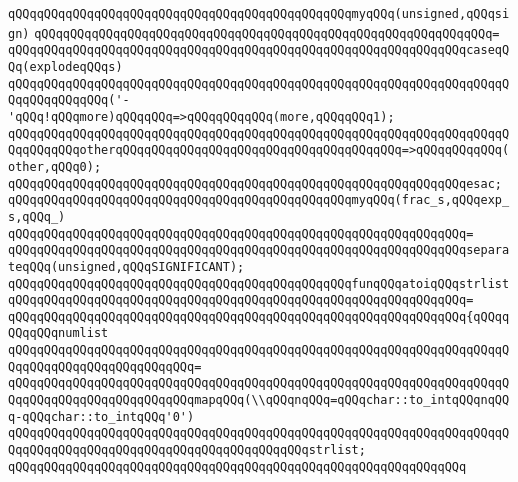 \verb|qQQqqQQqqQQqqQQqqQQqqQQqqQQqqQQqqQQqqQQqqQQqqQQqmyqQQq(unsigned,qQQqsign)|\newline
\verb|qQQqqQQqqQQqqQQqqQQqqQQqqQQqqQQqqQQqqQQqqQQqqQQqqQQqqQQqqQQqqQQq=|\newline
\verb|qQQqqQQqqQQqqQQqqQQqqQQqqQQqqQQqqQQqqQQqqQQqqQQqqQQqqQQqqQQqqQQqcaseqQQq(explodeqQQqs)|\newline
\verb|qQQqqQQqqQQqqQQqqQQqqQQqqQQqqQQqqQQqqQQqqQQqqQQqqQQqqQQqqQQqqQQqqQQqqQQqqQQqqQQqqQQq('-'qQQq!qQQqmore)qQQqqQQq=>qQQqqQQqqQQq(more,qQQqqQQq1);|\newline
\verb|qQQqqQQqqQQqqQQqqQQqqQQqqQQqqQQqqQQqqQQqqQQqqQQqqQQqqQQqqQQqqQQqqQQqqQQqqQQqqQQqotherqQQqqQQqqQQqqQQqqQQqqQQqqQQqqQQqqQQqqQQq=>qQQqqQQqqQQq(other,qQQq0);|\newline
\verb|qQQqqQQqqQQqqQQqqQQqqQQqqQQqqQQqqQQqqQQqqQQqqQQqqQQqqQQqqQQqqQQqesac;|\newline
\newline
\newline
\verb|qQQqqQQqqQQqqQQqqQQqqQQqqQQqqQQqqQQqqQQqqQQqqQQqmyqQQq(frac_s,qQQqexp_s,qQQq_)|\newline
\verb|qQQqqQQqqQQqqQQqqQQqqQQqqQQqqQQqqQQqqQQqqQQqqQQqqQQqqQQqqQQqqQQq=|\newline
\verb|qQQqqQQqqQQqqQQqqQQqqQQqqQQqqQQqqQQqqQQqqQQqqQQqqQQqqQQqqQQqqQQqseparateqQQq(unsigned,qQQqSIGNIFICANT);|\newline
\newline
\newline
\verb|qQQqqQQqqQQqqQQqqQQqqQQqqQQqqQQqqQQqqQQqqQQqqQQqfunqQQqatoiqQQqstrlist|\newline
\verb|qQQqqQQqqQQqqQQqqQQqqQQqqQQqqQQqqQQqqQQqqQQqqQQqqQQqqQQqqQQqqQQq=|\newline
\verb|qQQqqQQqqQQqqQQqqQQqqQQqqQQqqQQqqQQqqQQqqQQqqQQqqQQqqQQqqQQqqQQq{qQQqqQQqqQQqnumlist|\newline
\verb|qQQqqQQqqQQqqQQqqQQqqQQqqQQqqQQqqQQqqQQqqQQqqQQqqQQqqQQqqQQqqQQqqQQqqQQqqQQqqQQqqQQqqQQqqQQqqQQq=|\newline
\verb|qQQqqQQqqQQqqQQqqQQqqQQqqQQqqQQqqQQqqQQqqQQqqQQqqQQqqQQqqQQqqQQqqQQqqQQqqQQqqQQqqQQqqQQqqQQqqQQqmapqQQq(\\qQQqnqQQq=qQQqchar::to_intqQQqnqQQq-qQQqchar::to_intqQQq'0')|\newline
\verb|qQQqqQQqqQQqqQQqqQQqqQQqqQQqqQQqqQQqqQQqqQQqqQQqqQQqqQQqqQQqqQQqqQQqqQQqqQQqqQQqqQQqqQQqqQQqqQQqqQQqqQQqqQQqqQQqstrlist;|\newline
\verb|qQQqqQQqqQQqqQQqqQQqqQQqqQQqqQQqqQQqqQQqqQQqqQQqqQQqqQQqqQQqqQQq|\newline
